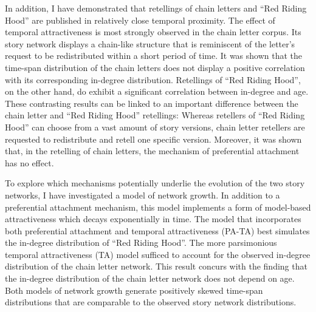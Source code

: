 In addition, I have demonstrated that retellings of chain letters and ``Red Riding Hood'' are published in relatively close temporal proximity. The effect of temporal attractiveness is most strongly observed in the chain letter corpus. Its story network displays a chain-like structure that is reminiscent of the letter's request to be redistributed within a short period of time. It was shown that the time-span distribution of the chain letters does not display a positive correlation with its corresponding in-degree distribution. Retellings of ``Red Riding Hood'', on the other hand, do exhibit a significant correlation between in-degree and age. These contrasting results can be linked to an important difference between the chain letter and ``Red Riding Hood'' retellings: Whereas retellers of ``Red Riding Hood'' can choose from a vast amount of story versions, chain letter retellers are requested to redistribute and retell one specific version. Moreover, it was shown that, in the retelling of chain letters, the mechanism of preferential attachment has no effect.

To explore which mechanisms potentially underlie the evolution of the two story networks, I have investigated a model of network growth. In addition to a preferential attachment mechanism, this model implements a form of model-based attractiveness which decays exponentially in time. The model that incorporates both preferential attachment and temporal attractiveness (PA-TA) best simulates the in-degree distribution of ``Red Riding Hood''. The more parsimonious temporal attractiveness (TA) model sufficed to account for the observed in-degree distribution of the chain letter network. This result concurs with the finding that the in-degree distribution of the chain letter network does not depend on age. Both models of network growth generate positively skewed time-span distributions that are comparable to the observed story network distributions. 

